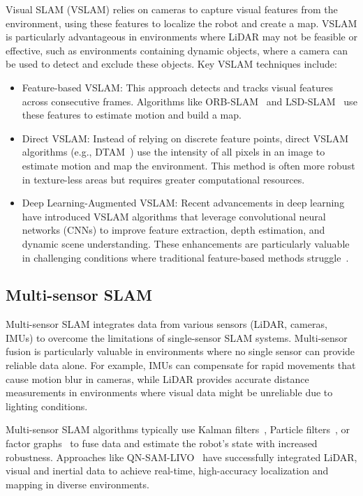 Visual SLAM (VSLAM) relies on cameras to capture visual features from the environment, using these features to localize the robot and create a map. VSLAM is particularly advantageous in environments where LiDAR may not be feasible or effective, such as environments containing dynamic objects, where a camera can be used to detect and exclude these objects. Key VSLAM techniques include:
\begin{itemize}
    \item Feature-based VSLAM: This approach detects and tracks visual features across consecutive frames. Algorithms like ORB-SLAM~\cite{orb_slam} and LSD-SLAM~\cite{lsd_slam} use these features to estimate motion and build a map.
    \item Direct VSLAM: Instead of relying on discrete feature points, direct VSLAM algorithms (e.g., DTAM~\cite{dtam}) use the intensity of all pixels in an image to estimate motion and map the environment. This method is often more robust in texture-less areas but requires greater computational resources.
    \item Deep Learning-Augmented VSLAM: Recent advancements in deep learning have introduced VSLAM algorithms that leverage convolutional neural networks (CNNs) to improve feature extraction, depth estimation, and dynamic scene understanding. These enhancements are particularly valuable in challenging conditions where traditional feature-based methods struggle~\cite{deep_learning_vslam}.
\end{itemize}

\subsection{Multi-sensor SLAM}

Multi-sensor SLAM integrates data from various sensors (LiDAR, cameras, IMUs) to overcome the limitations of single-sensor SLAM systems. Multi-sensor fusion is particularly valuable in environments where no single sensor can provide reliable data alone. For example, IMUs can compensate for rapid movements that cause motion blur in cameras, while LiDAR provides accurate distance measurements in environments where visual data might be unreliable due to lighting conditions.

Multi-sensor SLAM algorithms typically use Kalman filters~\cite{kalman1960}, Particle filters~\cite{particle_filter}, or factor graphs~\cite{factor_graph} to fuse data and estimate the robot’s state with increased robustness. Approaches like QN-SAM-LIVO~\cite{qn_sam_livo} have successfully integrated LiDAR, visual and inertial data to achieve real-time, high-accuracy localization and mapping in diverse environments.

